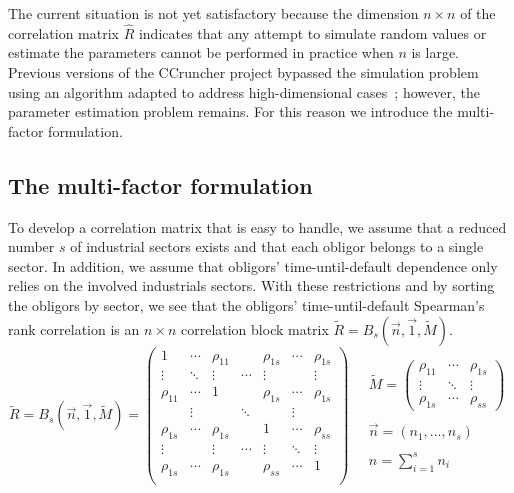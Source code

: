 \documentclass[11pt,fleqn]{book} %
\begin{document}
The current situation is not yet satisfactory because the dimension 
$n {\times} n$ of the correlation matrix $\widehat{R}$ indicates that any 
attempt to simulate random values or estimate the parameters cannot 
be performed in practice when $n$ is large. Previous versions of the 
CCruncher project bypassed the simulation problem using an algorithm 
adapted to address high-dimensional cases~\cite{torrent:2011}; however, 
the parameter estimation problem remains. For this reason we introduce 
the multi-factor formulation.

\subsection{The multi-factor formulation}

To develop a correlation matrix that is easy to handle, we assume that a 
reduced number $s$ of industrial sectors exists and that each obligor belongs 
to a single sector. In addition, we assume that obligors' time-until-default 
dependence only relies on the involved industrials sectors. With these 
restrictions and by sorting the obligors by sector, we see that the obligors' 
time-until-default Spearman's rank correlation is an $n {\times} n$ correlation
block matrix $\widetilde{R} = B_s(\vec{n},\vec{1},\widetilde{M})$.
\begin{displaymath}
	\widetilde{R} = B_s(\vec{n},\vec{1},\widetilde{M}) = 
	\left(
	\begin{array}{ccccccc}
		1         & \cdots & \rho_{11} &        & \rho_{1s} & \cdots & \rho_{1s} \\
		\vdots    & \ddots & \vdots    & \cdots & \vdots    &        & \vdots    \\
		\rho_{11} & \cdots & 1         &        & \rho_{1s} & \cdots & \rho_{1s} \\
		
		          & \vdots &           & \ddots &           & \vdots &           \\
		
		\rho_{1s} & \cdots & \rho_{1s} &        & 1         & \cdots & \rho_{ss} \\
		\vdots    &        & \vdots    & \cdots & \vdots    & \ddots & \vdots    \\
		\rho_{1s} & \cdots & \rho_{1s} &        & \rho_{ss} & \cdots & 1         \\
	\end{array}
	\right)
	\quad 
	\begin{array}{l}
		\widetilde{M} = 
		\left(
		\begin{array}{ccc}
			\rho_{11} & \cdots & \rho_{1s} \\
			\vdots    & \ddots & \vdots    \\
			\rho_{1s} & \cdots & \rho_{ss}
		\end{array}
		\right) \\
		\\
		\vec{n} = (n_1,\dots,n_s) \\
		\\
		n = \displaystyle \sum_{i=1}^{s} n_i
	\end{array}
\end{displaymath}
\end{document}

